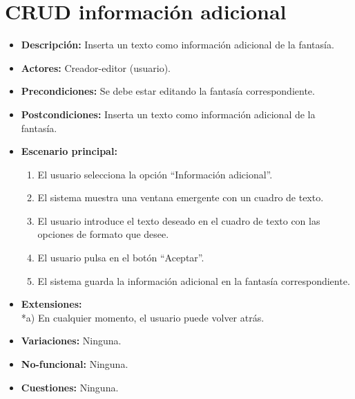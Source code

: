 \section{CRUD información adicional}
\begin{itemize}
	\item \textbf{Descripción:} Inserta un texto como información adicional de la fantasía.
	\item \textbf{Actores:} Creador-editor (usuario).
	\item \textbf{Precondiciones:} Se debe estar editando la fantasía correspondiente.
	\item \textbf{Postcondiciones:} Inserta un texto como información adicional de la fantasía.
	\item \textbf{Escenario principal:}
	\begin{enumerate}
		\item El usuario selecciona la opción ``Información adicional''.
		\item El sistema muestra una ventana emergente con un cuadro de texto.
		\item El usuario introduce el texto deseado en el cuadro de texto con las opciones de formato que desee. 
		\item El usuario pulsa en el botón ``Aceptar''.
		\item El sistema guarda la información adicional en la fantasía correspondiente.
	\end{enumerate}
	\item \textbf{Extensiones:} \\ *a) En cualquier momento, el usuario puede volver atrás.
	\item \textbf{Variaciones:} Ninguna.
	\item \textbf{No-funcional:} Ninguna.
	\item \textbf{Cuestiones:} Ninguna.
\end{itemize}

